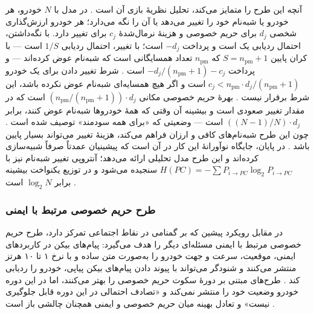 آنچه این طرح را متمایز می‌کند، تحلیل نظریهٔ بازی آن است \cite{luPseudonymChangingSocial2012}. در مدل با $N$ خودرو، هر خودرو یا شبه‌نام خود را تغییر می‌دهد یا آن را نگه می‌دارد؛ هر خودرو ارزش‌گذاری شخصی $d_j$ برای حریم خصوصی و هزینهٔ نرمال‌شدهٔ $c_j$ برای تغییر دارد. با نگه‌داشتن، احتمال ردیابی یک است و پرداخت $-d_j$ است؛ با تغییر، احتمال ردیابی $1/S$ است — با کران پایین $S = n_{\mathrm{pm}}+1$ که $n_{\mathrm{pm}}$ تعداد همسایگانی است که شبه‌نام عوض کرده‌اند — و پرداخت $-d_j/(n_{\mathrm{pm}}+1) - c_j$ است \cite{luPseudonymChangingSocial2012}. شرط تغییر دادن برای یک خودرو $c_j < n_{\mathrm{pm}}{\cdot}d_j/(n_{\mathrm{pm}}+1)$ است و اگر هیچ همسایه‌ای شبه‌نام عوض نکرده باشد، این شرط برقرار نیست \cite{luPseudonymChangingSocial2012}. بهرهٔ حریم خصوصی مکانی $(n_{\mathrm{pm}}/(n_{\mathrm{pm}}+1)){\cdot}d_j$ است که در مقدار تغییر صعودی است و بیشینه آن وقتی که همهٔ خودروها شبه‌نام عوض کنند، برابر $((N-1)/N){\cdot}d_j$ است — وضعیتی که «برای همه سودمند» توصیف شده است \cite{luPseudonymChangingSocial2012}. چون این طرح شبه‌نام‌های کافی و ارزان فراهم می‌کند، هزینهٔ تغییر می‌تواند بسیار پایین باشد \cite{luPseudonymChangingSocial2012}. در پایان، جایگاه نوآورانهٔ این کار در آن است که پیشینیان عمدتاً صرفاً شبیه‌سازی کرده‌اند و این طرح مدل تحلیلی ارائه می‌دهد؛ آنتروپی تغییر شبه‌نام نیز با $H(PC) = -\sum P_{i \to PC} \log_2 P_{i \to PC}$ سنجیده می‌شود و در توزیع یکنواخت بیشینه برابر $\log_2 N$ است \cite{luPseudonymChangingSocial2012}.

\subsubsection{طرح حریم خصوصی مرتبط با ایمنی }

در مقابل رویکرد پیشین که بر گمنامی در نقاط اجتماعی تمرکز دارد، طرح حریم خصوصی مرتبط با ایمنی  مسئله‌ای دیگر را هدف می‌گیرد: پیام‌های بیکن در کاربردهای ایمنی، موقعیت، سرعت و جهت خودرو را به‌صورت متن ساده و با نرخ ۱ تا ۱۰ هرتز منتشر می‌کنند و شنودگر می‌تواند با پیوند دادن پیام‌های بیکن پیاپی، خودرو را ردیابی کند \cite{al-aniPrivacySafetyImprovement2023}. طرح‌های مبتنی بر دورهٔ سکوت حریم خصوصی را بهتر می‌کنند، اما در این دوره خودرو وضعیت خود را منتشر نمی‌کند و «تصادف احتمالی در این دوره قابل جلوگیری نیست» و تعادل بهینه میان حریم خصوصی و ایمنی همچنان چالشی باز است \cite{al-aniPrivacySafetyImprovement2023}.


